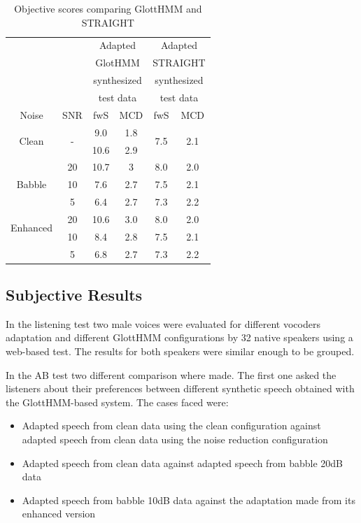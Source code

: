 \begin{table}[htb]
\begin{centering}
\begin{tabular}{c c|c c|c c}
	 & & \multicolumn{2}{c|}{Adapted} & \multicolumn{2}{c}{Adapted}\\
	 & & \multicolumn{2}{c|}{GlotHMM} & \multicolumn{2}{c}{STRAIGHT}\\
	 & & \multicolumn{2}{c|}{synthesized} & \multicolumn{2}{c}{synthesized}\\
	 & & \multicolumn{2}{c|}{test data} & \multicolumn{2}{c}{test data}\\
	Noise & SNR & fwS & MCD & fwS & MCD\\
	\midrule
	\midrule
	\multirow{2}{*}{Clean} & \multirow{2}{*}{-} & 9.0 & 1.8 & \multirow{2}{*}{7.5} & \multirow{2}{*}{2.1}\\
	 & & 10.6 & 2.9 & & \\	
	\midrule
	\multirow{3}{*}{Babble} & 20 & 10.7 & 3 & 8.0 & 2.0\\
	 & 10 & 7.6 & 2.7 & 7.5 & 2.1\\
	 & 5 & 6.4 & 2.7 & 7.3 & 2.2\\
	\midrule
	\midrule
	\multirow{2}{*}{Enhanced} & 20 & 10.6 & 3.0 & 8.0 & 2.0\\
	\multirow{2}{*}{Babble} & 10 & 8.4 & 2.8 & 7.5 & 2.1\\
	 & 5 & 6.8 & 2.7 & 7.3 & 2.2\\
	\bottomrule
\end{tabular}
\caption{Objective scores comparing GlottHMM and STRAIGHT}
\label{table:comp_adapt_results}
\end{centering}
\end{table}

\subsection{Subjective Results}
\label{results_subjective}
In the listening test two male voices were evaluated for different vocoders adaptation and different GlottHMM configurations by 32 native speakers using a web-based test.
%
The results for both speakers were similar enough to be grouped.

In the AB test two different comparison where made.
%
The first one asked the listeners about their preferences between different synthetic speech obtained with the GlottHMM-based system.
%
The cases faced were:

\begin{itemize}
	\item Adapted speech from clean data using the clean configuration against adapted speech from clean data using the noise reduction configuration
	\item Adapted speech from clean data against adapted speech from babble 20dB data
	\item Adapted speech from babble 10dB data against the adaptation made from its enhanced version
\end{itemize}

